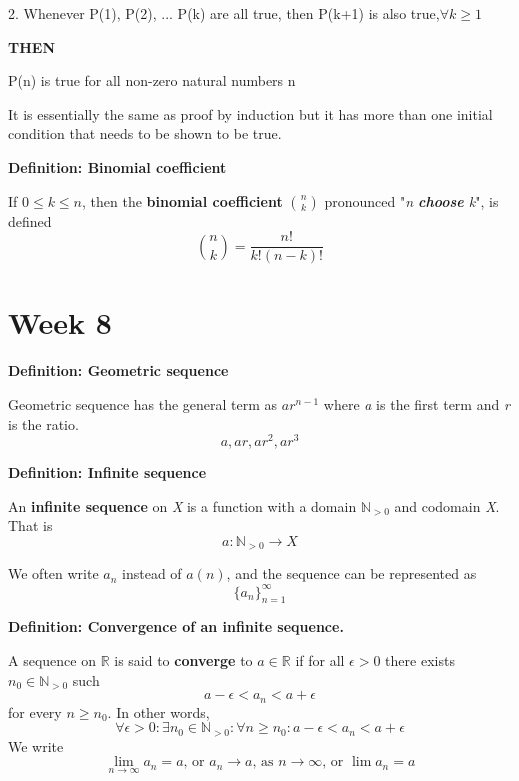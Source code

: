 \documentclass{article}
\newcommand*{\N}{\mathbb{N}}
\newcommand*{\R}{\mathbb{R}}
\begin{document}
\hspace{\parindent} 2. Whenever P(1), P(2), ... P(k) are all true, then P(k+1) is also true,\(\forall k \geq 1\)

\hspace{\parindent} \textbf{THEN}

\hspace{\parindent} P(n) is true for all non-zero natural numbers n

It is essentially the same as proof by induction but it has more than one initial condition that needs to be shown to be true.

\vspace{\baselineskip}
\textbf{Definition: Binomial coefficient}

If \(0 \leq k \leq n\), then the \textbf{binomial coefficient} \(\binom{n}{k}\) pronounced "\textit{n \textbf{choose} k}", is defined
\begin{equation}
    \binom{n}{k} = \frac{n!}{k!(n-k)!}
\end{equation}

\section{Week 8}
\textbf{Definition: Geometric sequence}

Geometric sequence has the general term as \(ar^{n-1}\) where \textit{a} is the first term and \textit{r} is the ratio.
\begin{equation}
    a,ar,ar^2,ar^3
\end{equation}

\vspace{\baselineskip}
\textbf{Definition: Infinite sequence}

An \textbf{infinite sequence} on \textit{X} is a function with a domain \(\N_{>0}\) and codomain \textit{X}. That is
\begin{equation}
    a:\N_{>0} \to X
\end{equation}

We often write \(a_n\) instead of \(a(n)\), and the sequence can be represented as
\begin{equation}
    \{a_n\}^{\infty}_{n=1}
\end{equation}

\vspace{\baselineskip}
\textbf{Definition: Convergence of an infinite sequence.}

A sequence on \(\R\) is said to \textbf{converge} to \(a \in \R\) if for all \(\epsilon > 0\) there exists \(n_0 \in \N_{>0}\) such
\begin{equation}
    a - \epsilon < a_n < a + \epsilon
\end{equation}
for every \(n \geq n_0\). In other words,
\begin{equation}
    \forall \epsilon > 0: \exists n_0 \in \N_{>0}: \forall n \geq n_0: a-\epsilon<a_n<a+\epsilon
\end{equation}
We write
\begin{equation}
\lim_{n \to \infty}a_n = a\text{, or }a_n \to a\text{, as }n \to \infty\text{, or }\lim a_n = a
\end{equation}
\end{document}
